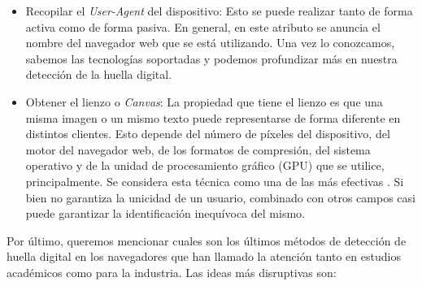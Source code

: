 \begin{itemize}
	\item Recopilar el \textit{User-Agent} del dispositivo: Esto se puede realizar tanto de forma activa como de forma pasiva. En general, en este atributo se anuncia el nombre del navegador web que se está utilizando. Una vez lo conozcamos, sabemos las tecnologías soportadas y podemos profundizar más en nuestra detección de la huella digital. \par 
	
	\item Obtener el lienzo o \textit{Canvas}: La propiedad que tiene el lienzo es que una misma imagen o un mismo texto puede representarse de forma diferente en distintos clientes. Esto depende del número de píxeles del dispositivo, del motor del navegador web, de los formatos de compresión, del sistema operativo y de la unidad de procesamiento gráfico (GPU) que se utilice, principalmente. Se considera esta técnica como una de las más efectivas \cite{never_forget_paper}. Si bien no garantiza la unicidad de un usuario, combinado con otros campos casi puede garantizar la identificación inequívoca del mismo. \par 
	
\end{itemize}

Por último, queremos mencionar cuales son los últimos métodos de detección de huella digital en los navegadores que han llamado la atención tanto en estudios académicos como para la industria. Las ideas más disruptivas son: \par

